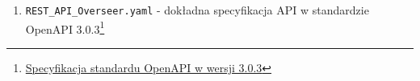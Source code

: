 \documentclass[../deliverable-two.tex]{subfiles}
\begin{document}
\begin{enumerate}
    \item \texttt{REST\_API\_Overseer.yaml} - dokładna specyfikacja API w standardzie OpenAPI 3.0.3\footnote{\href{https://github.com/OAI/OpenAPI-Specification/blob/main/versions/3.0.3.md}{Specyfikacja standardu OpenAPI w wersji 3.0.3}}
\end{enumerate}
\end{document}

